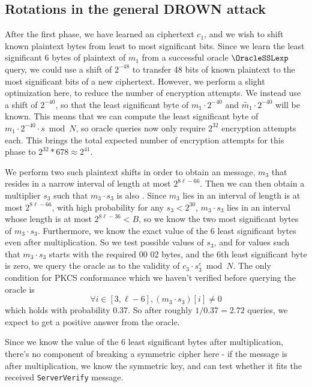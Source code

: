 \subsection{Rotations in the general DROWN attack}
\label{sec:general-rotations}
After the first phase, we have learned an \sslconform ciphertext $c_1$, and we wish to shift known plaintext bytes from least to most significant bits.
Since we learn the least significant 6 bytes of plaintext of $m_1$ from a successful oracle $\OracleSSLexp$ query, we could use a shift of $2^{-48}$ to transfer 48 bits of known plaintext to the most significant bits of a new ciphertext.  However, we perform a slight optimization here, to reduce the number of encryption attempts.  We instead use a shift of $2^{-40}$, so that the least significant byte of $m_1 \cdot 2^{-40}$ and $\tilde{m_1} \cdot 2^{-40}$ will be known.  This means that we can compute the least significant byte of $m_1 \cdot 2^{-40} \cdot s \bmod N$, so oracle queries now only require $2^{32}$ encryption attempts each. This brings the total expected number of encryption attempts for this phase to
$2^{32} * 678 \approx 2^{41}$.

We perform two such plaintext shifts in order to obtain an \sslconform message, $m_3$ that resides in a narrow interval of length at most $2^{8\ell-66}$. Then we can then obtain a multiplier $s_3$ such that $m_3 \cdot s_3$ is also \sslconform.
Since $m_3$ lies in an interval of length is at most $2^{8\ell-66}$, with high probability for any $s_3 < 2^{30}$, $m_3 \cdot s_3$ lies in an interval whose length is at most $2^{8\ell-36} < B$, so we know the two most significant bytes of $m_3 \cdot s_3$.
Furthermore, we know the exact value of the 6 least significant bytes even after multiplication.
So we test possible values of $s_3$, and for values such that $m_3 \cdot s_3$ starts with the required 00 02 bytes, and the 6th least significant byte is zero, we query the oracle as to the validity of $c_3 \cdot s_3^e \bmod N$.
The only condition for PKCS conformance which we haven't verified before querying the oracle is
\[
\forall i \in [3, \ell-6], (m_3 \cdot s_3)[i] \neq 0
\]
which holds with probability 0.37.
So after roughly $1 / 0.37 = 2.72$ queries, we expect to get a positive answer from the oracle.

Since we know the value of the 6 least significant bytes after multiplication, there's no component of breaking a symmetric cipher here - if the message is \sslconform after multiplication, we know the symmetric key, and can test whether it fits the received \texttt{ServerVerify} message.

